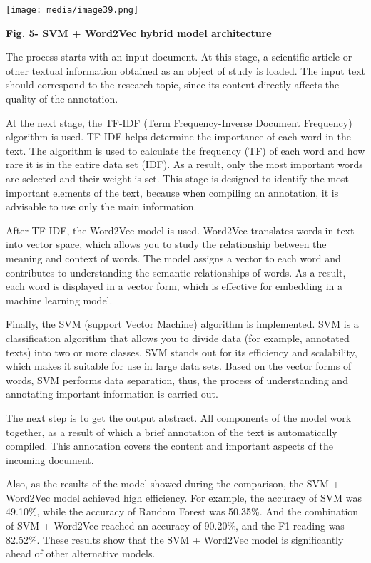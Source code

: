 \documentclass[
]{article}
\begin{document}
\texttt{[image: media/image39.png]}

\textbf{Fig. 5- SVM + Word2Vec hybrid model architecture}

The process starts with an input document. At this stage, a scientific
article or other textual information obtained as an object of study is
loaded. The input text should correspond to the research topic, since
its content directly affects the quality of the annotation.

At the next stage, the TF-IDF (Term Frequency-Inverse Document
Frequency) algorithm is used. TF-IDF helps determine the importance of
each word in the text. The algorithm is used to calculate the frequency
(TF) of each word and how rare it is in the entire data set (IDF). As a
result, only the most important words are selected and their weight is
set. This stage is designed to identify the most important elements of
the text, because when compiling an annotation, it is advisable to use
only the main information.

After TF-IDF, the Word2Vec model is used. Word2Vec translates words in
text into vector space, which allows you to study the relationship
between the meaning and context of words. The model assigns a vector to
each word and contributes to understanding the semantic relationships of
words. As a result, each word is displayed in a vector form, which is
effective for embedding in a machine learning model.

Finally, the SVM (support Vector Machine) algorithm is implemented. SVM
is a classification algorithm that allows you to divide data (for
example, annotated texts) into two or more classes. SVM stands out for
its efficiency and scalability, which makes it suitable for use in large
data sets. Based on the vector forms of words, SVM performs data
separation, thus, the process of understanding and annotating important
information is carried out.

The next step is to get the output abstract. All components of the model
work together, as a result of which a brief annotation of the text is
automatically compiled. This annotation covers the content and important
aspects of the incoming document.

Also, as the results of the model showed during the comparison, the SVM
+ Word2Vec model achieved high efficiency. For example, the accuracy of
SVM was 49.10\%, while the accuracy of Random Forest was 50.35\%. And
the combination of SVM + Word2Vec reached an accuracy of 90.20\%, and
the F1 reading was 82.52\%. These results show that the SVM + Word2Vec
model is significantly ahead of other alternative models.
\end{document}
